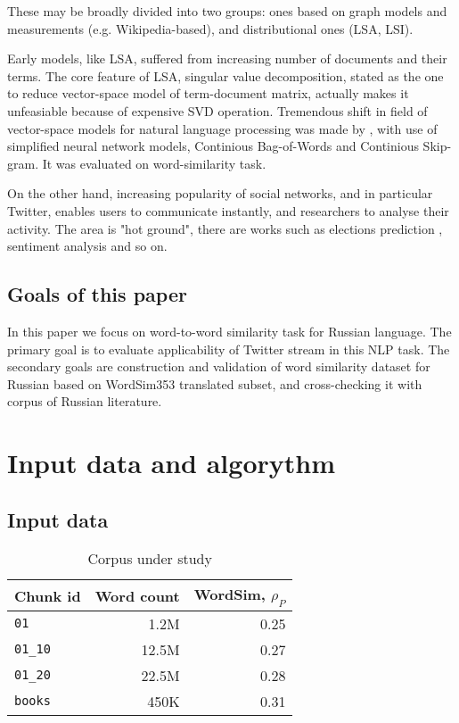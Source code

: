\documentclass[11pt,letterpaper]{article}
\begin{document}
These may be broadly divided into two groups: ones based on graph models and 
measurements (e.g. Wikipedia-based), and distributional ones (LSA, LSI).

Early models, like LSA, suffered from increasing number of documents and their terms. 
The core feature of LSA, singular value decomposition, stated as the one to reduce vector-space model 
of term-document matrix, actually makes it unfeasiable because of expensive SVD operation.
Tremendous shift in field of vector-space models for natural language processing was made 
by \cite{mikolov2013efficient}, with use of simplified neural network models, Continious Bag-of-Words
and Continious Skip-gram. It was evaluated on word-similarity task. 

On the other hand, increasing popularity of social networks, and in particular Twitter,
enables users to communicate instantly, and researchers to analyse their activity.
The area is "hot ground", there are works such as elections prediction \cite{metaxas2011not}, sentiment
analysis and so on.

\subsection{Goals of this paper}

In this paper we focus on word-to-word similarity task for Russian language. The primary goal
is to evaluate applicability of Twitter stream in this NLP task. The secondary goals are
construction and validation of word similarity dataset for Russian based on WordSim353 translated 
subset, and cross-checking it with corpus of Russian literature.


\section{Input data and algorythm}

\subsection{Input data}

\begin{table}
\begin{center}
\begin{tabular}{|l|r|r|}
\hline \bf Chunk id & \bf Word count & \bf WordSim, $\rho_P$  \\ \hline
{\tt 01} & 1.2M  & 0.25\\
{\tt 01\_10} & 12.5M & 0.27 \\
{\tt 01\_20} & 22.5M & 0.28 \\
{\tt books} & 450K & 0.31 \\
\hline
\end{tabular}
\end{center}
\caption{\label{chunk-size-table} Corpus under study }
\end{table}
\end{document}
